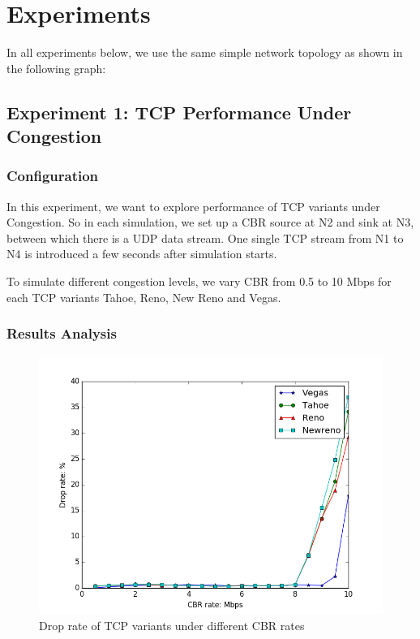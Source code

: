 \documentclass[10pt, conference]{IEEEtran/IEEEtran}
\begin{document}
\section{Experiments}
In all experiments below, we use the same simple network topology as shown in the following graph:

\centerline{
}

\subsection{Experiment 1: TCP Performance Under Congestion}
\subsubsection{Configuration}

In this experiment, we want to explore performance of TCP variants under Congestion. So in each simulation, we set up a CBR source at N2 and sink at N3, between which there is a UDP data stream. One single TCP stream from N1 to N4 is introduced a few seconds after simulation starts.

To simulate different congestion levels, we vary CBR from 0.5 to 10 Mbps for each TCP variants Tahoe, Reno, New Reno and Vegas.


\subsubsection{Results Analysis}

\begin{figure}[!ht]
\begin{center}
\includegraphics[width=\linewidth]{../exp1/exp1_drop.png}
\caption{Drop rate of TCP variants under different CBR rates}
\label{exp1_drop}
\end{center}
\end{figure}
\end{document}
